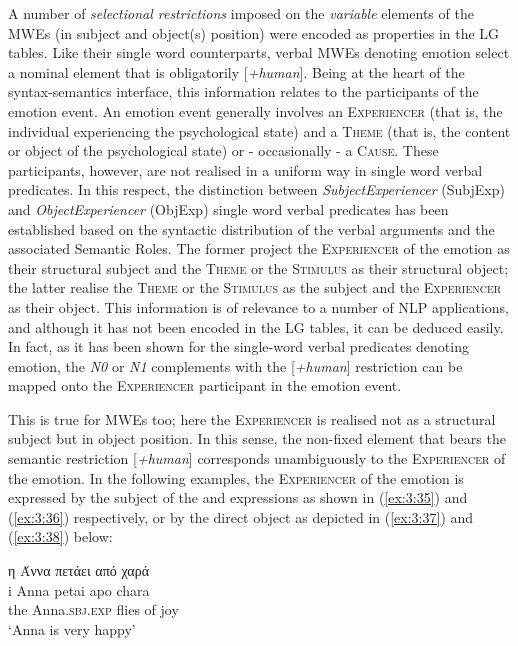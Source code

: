 \documentclass[output=paper]{langsci/langscibook}
\begin{document}
Α number of \textit{selectional restrictions} imposed on
the \textit{variable} elements of the MWEs (in subject and
object(s) position) were encoded as properties in the LG tables. Like
their single word counterparts, verbal MWEs denoting emotion select a
nominal element that is obligatorily [\textit{+human}]. Being at the
heart of the syntax-semantics interface, this information relates to
the participants of the emotion event. An emotion event generally
involves an \textsc{Experiencer} (that is, the individual experiencing
the psychological state) and a \textsc{Theme} (that is, the content or
object of the psychological state) or - occasionally - a
\textsc{Cause.} These participants, however, are not realised in a
uniform way in single word verbal predicates. In this respect, the
distinction between  \textit{SubjectExperiencer} (SubjExp)
and  \textit{ObjectExperiencer} (ObjExp) single word verbal
predicates has been established \citep{beletti1998} based on the
syntactic distribution of the verbal arguments and the associated
Semantic Roles. The former project the \textsc{Experiencer} of the
emotion as their structural subject and the \textsc{Theme} or the
\textsc{Stimulus} as their structural object; the latter realise the
\textsc{Theme} or the \textsc{Stimulus} as the subject and the
\textsc{Experiencer} as their object. This information is of relevance
to a number of NLP applications, and although it has not been encoded
in the LG tables, it can be deduced easily. In fact, as it has been
shown \citep{giouli2014} for the single-word verbal predicates
denoting emotion, the \textit{N0} or \textit{N1} complements with the
[\textit{+human}] restriction can be mapped onto the
\textsc{Experiencer} participant in the emotion event.



This is  true for MWEs too; here the \textsc{Experiencer} is
realised not as a structural subject but in object position. In this
sense, the non-fixed element that bears the semantic restriction
[\textit{+human}] corresponds unambiguously to the \textsc{Experiencer}
of the emotion. In the following examples, the \textsc{Experiencer} of
the emotion is expressed by the subject of the  and  expressions as
shown in (\ref{ex:3:35}) and (\ref{ex:3:36}) respectively, or by the direct object as
depicted in (\ref{ex:3:37}) and (\ref{ex:3:38}) below:

\begin{exe}
\ex \label{ex:3:35}
\glll  η Άννα πετάει από χαρά \\
i Anna petai apo chara\\
 the  Anna.\textsc{sbj.exp} flies of joy\\
\glt  %
‘Anna is very happy’
\end{exe}
\end{document}
